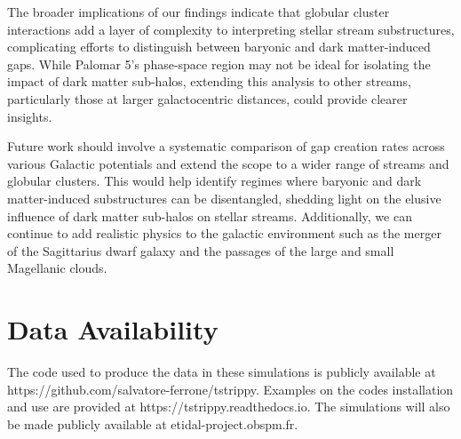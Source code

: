 \documentclass{aa}
\begin{document}
  The broader implications of our findings indicate that globular cluster interactions add a layer of complexity to interpreting stellar stream substructures, complicating efforts to distinguish between baryonic and dark matter-induced gaps. While Palomar 5's phase-space region may not be ideal for isolating the impact of dark matter sub-halos, extending this analysis to other streams, particularly those at larger galactocentric distances, could provide clearer insights. 

  Future work should involve a systematic comparison of gap creation rates across various Galactic potentials and extend the scope to a wider range of streams and globular clusters. This would help identify regimes where baryonic and dark matter-induced substructures can be disentangled, shedding light on the elusive influence of dark matter sub-halos on stellar streams. Additionally, we can continue to add realistic physics to the galactic environment such as the merger of the Sagittarius dwarf galaxy and the passages of the large and small Magellanic clouds. 


  
\section*{Data Availability}

  The code used to produce the data in these simulations is publicly available at https://github.com/salvatore-ferrone/tstrippy. Examples on the codes installation and use are provided at https://tstrippy.readthedocs.io. The simulations will also be made publicly available at etidal-project.obspm.fr.







\end{document}

